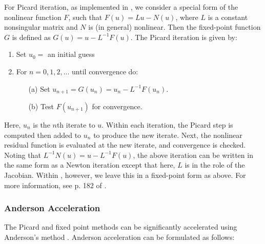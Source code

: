 
For Picard iteration, as implemented in {\kinsol}, we consider a special form
of the nonlinear function $F$, such that $F(u) = Lu - N(u)$, where $L$ is a constant
nonsingular matrix and $N$ is (in general) nonlinear.  Then the fixed-point
function $G$ is defined as $G(u) = u - L^{-1}F(u)$.
The Picard iteration is given by:

\vspace{1ex}
\begin{enumerate}
   \item Set $u_0 = $ an initial guess
   \item For $n = 0, 1, 2,...$ until convergence do:
      \begin{itemize}
          \item[(a)] Set $u_{n+1} = G(u_n) = u_n - L^{-1}F(u_n)$.
          \item[(b)] Test $F(u_{n+1})$ for convergence.
      \end{itemize}
\end{enumerate}
Here, $u_n$ is the $n$th iterate to $u$.
Within each iteration, the Picard step is computed then added to $u_n$ to produce 
the new iterate.  Next, the nonlinear residual
function is evaluated at the new iterate, and convergence is checked.
Noting that $L^{-1}N(u) = u - L^{-1}F(u)$, the above iteration can be written in the same form
as a Newton iteration except that here, $L$ is in the role of the Jacobian.
Within {\kinsol}, however, we leave this in a fixed-point form as above. 
For more information, see p. 182 of \cite{Ortega-Rheinbolt00}.



\subsubsection*{Anderson Acceleration}
The Picard and fixed point methods can be significantly accelerated using 
Anderson's method \cite{Anderson65, Walker-Ni09, Fang-Saad09, LWWY11}.
Anderson acceleration can be formulated as follows:

